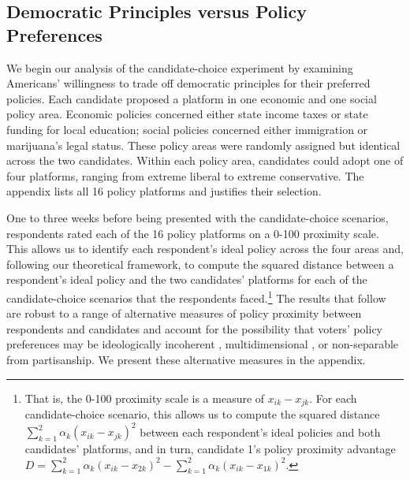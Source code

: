 \documentclass[letterpaper, 12pt]{article}
\begin{document}
\begin{raggedright}

\subsection{Democratic Principles versus Policy Preferences}
\label{sec: policy}

We begin our analysis of the candidate-choice experiment by examining Americans' willingness to trade off democratic principles for their preferred policies. Each candidate proposed a platform in one economic and one social policy area. Economic policies concerned either state income taxes or state funding for local education; social policies concerned either immigration or marijuana's legal status. These policy areas were randomly assigned but identical across the two candidates. Within each policy area, candidates could adopt one of four platforms, ranging from extreme liberal to extreme conservative. The appendix lists all 16 policy platforms and justifies their selection.

One to three weeks before being presented with the candidate-choice scenarios, respondents rated each of the 16 policy platforms on a 0-100 proximity scale. This allows us to identify each respondent's ideal policy across the four areas and, following our theoretical framework, to compute the squared distance between a respondent's ideal policy and the two candidates' platforms for each of the candidate-choice scenarios that the respondents faced.\footnote{That is, the 0-100 proximity scale is a measure of $x_{ik}-x_{jk}$. For each candidate-choice scenario, this allows us to compute the squared distance $\sum\limits_{k=1}^2  \alpha_k (x_{ik} - x_{jk})^2$ between each respondent's ideal policies and both candidates' platforms, and in turn, candidate 1's policy proximity advantage $D=\sum\limits_{k=1}^2  \alpha_k (x_{ik} - x_{2k})^2-\sum\limits_{k=1}^2  \alpha_k (x_{ik} - x_{1k})^2$.} The results that follow are robust to a range of alternative measures of policy proximity between respondents and candidates and account for the possibility that voters' policy preferences may be ideologically incoherent \citep{Converse1964}, multidimensional \citep{Treier2009}, or non-separable from partisanship. We present these alternative measures in the appendix.


\end{raggedright}
\end{document}

